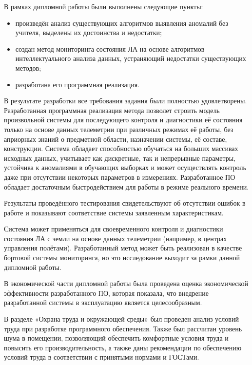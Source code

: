 В рамках дипломной работы были выполнены следующие пункты:
\begin{itemize} 
	\item произведён анализ существующих алгоритмов выявления аномалий без учителя, выделены их достоинства и недостатки;
	\item создан метод мониторинга состояния ЛА на основе алгоритмов интеллектуального анализа данных, устраняющий недостатки существующих методов;
	\item разработана его программная реализация.
\end{itemize}

В результате разработки все требования задания были полностью удовлетворены. Разработанная программная реализация метода позволет строить модель произвольной системы для последующего контроля и диагностики её состояния только на основе данных телеметрии при различных режимах её работы, без априорных знаний о предметной области, назначении системы, её составе, конструкции. Система обладает способностью обучаться на больших массивах исходных данных, учитывает как дискретные, так и непрерывные параметры, устойчива к аномалиями в обучающих выборках и может осуществлять контроль даже при отсутствии некоторых параметров в измерениях. Разработанное ПО обладает достаточным быстродействием для работы в режиме реального времени.

Результаты проведённого тестирования свидетельствуют об отсутствии ошибок в работе и показывают соответствие системы заявленным характеристикам.

Система может применяться для своевременного контроля и диагностики состояния ЛА с земли на основе данных телеметрии (например, в центрах управления полётами). Разработанный метод может быть реализован в качестве бортовой системы мониторинга, но это исследование выходит за рамки данной дипломной работы.

В экономической части дипломной работы была проведена оценка экономической эффективности разработанного ПО, которая показала, что внедрение разработанной системы в эксплуатацию является целесообразным.

В разделе «Охрана труда и окружающей среды» был проведен анализ условий труда при разработке программного обеспечения. Также был рассчитан уровень шума в помещении, позволяющий обеспечить комфортные условия труда и повысить его производительность, а также даны рекомендации по обеспечению условий труда в соответствии с принятыми нормами и ГОСТами.